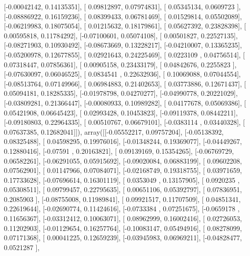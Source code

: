\documentclass{article}
\begin{document}
       [-0.00042142,  0.14135351],
       [ 0.09812897,  0.07974831],
       [ 0.05345134,  0.0609723 ],
       [-0.08886922,  0.16159236],
       [ 0.08399433,  0.06781469],
       [ 0.01529814,  0.05502089],
       [-0.06219983,  0.18075054],
       [ 0.01215632,  0.18179861],
       [ 0.05627392,  0.23828398],
       [ 0.00595818,  0.11784292],
       [-0.07100601,  0.05074108],
       [ 0.00501827,  0.22527135],
       [-0.08271903,  0.10930492],
       [-0.08673669,  0.13228217],
       [-0.04210007,  0.13365235],
       [-0.05200978,  0.12677855],
       [ 0.02921643,  0.24225469],
       [ 0.0223109 ,  0.04756514],
       [ 0.07318447,  0.07856361],
       [ 0.00905158,  0.23433179],
       [ 0.04842676,  0.2255823 ],
       [-0.07630097,  0.06046525],
       [ 0.0834541 ,  0.22632936],
       [ 0.10069088,  0.07044554],
       [-0.08513764,  0.07149966],
       [ 0.06984883,  0.21402653],
       [ 0.03773886,  0.12671437],
       [ 0.05094181,  0.18285335],
       [-0.01978798,  0.04270277],
       [-0.04990778,  0.20221029],
       [-0.03809281,  0.21366447],
       [-0.00080933,  0.10989282],
       [ 0.04177678,  0.05069386],
       [ 0.05421908,  0.06645423],
       [ 0.02993428,  0.10453823],
       [-0.09119378,  0.08442211],
       [-0.09180803,  0.22964335],
       [ 0.00510767,  0.06679101],
       [-0.0383114 ,  0.03440328],
       [ 0.07637385,  0.12682041]]), array([[-0.05552217,  0.09757204],
       [-0.05138392,  0.08325488],
       [ 0.04598295,  0.19976016],
       [-0.01348244,  0.19369077],
       [-0.04449267,  0.12880416],
       [-0.07591   ,  0.20163821],
       [ 0.09139169,  0.15354265],
       [-0.06769729,  0.06582261],
       [-0.06291055,  0.05915692],
       [-0.09020084,  0.06883199],
       [ 0.09602208,  0.07562901],
       [ 0.01147966,  0.07084071],
       [-0.02168749,  0.19318755],
       [ 0.03971659,  0.17733628],
       [-0.07696614,  0.16301119],
       [ 0.0353049 ,  0.13157905],
       [ 0.0920235 ,  0.05308511],
       [ 0.09799457,  0.22795635],
       [ 0.00651106,  0.05392797],
       [ 0.07836951,  0.2085903 ],
       [-0.08755008,  0.11989841],
       [ 0.09921517,  0.11707509],
       [ 0.04851341,  0.22619644],
       [-0.02690774,  0.11424616],
       [-0.0733384 ,  0.07251675],
       [-0.0659178 ,  0.11656367],
       [-0.03312412,  0.10063071],
       [ 0.08962999,  0.16002416],
       [ 0.02726053,  0.11202903],
       [-0.01129654,  0.16257764],
       [-0.10083147,  0.05494916],
       [ 0.08278099,  0.07171368],
       [ 0.00041225,  0.12659239],
       [-0.03945983,  0.06969211],
       [-0.04828477,  0.0521287 ],
\end{document}
